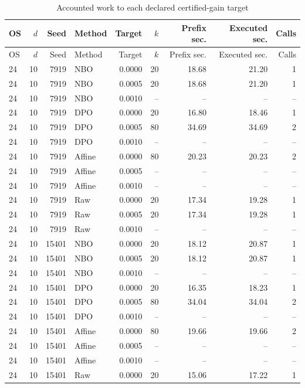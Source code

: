 \begingroup\small\setlength{\tabcolsep}{3pt}
\begin{longtable}{lrrlrrrrr}
\caption{Accounted work to each declared certified-gain target}\label{tab:r14targets}\\
\toprule
OS & $d$ & Seed & Method & Target & $k$ & Prefix sec. & Executed sec. & Calls\\\midrule
\endfirsthead
\toprule
OS & $d$ & Seed & Method & Target & $k$ & Prefix sec. & Executed sec. & Calls\\\midrule
\endhead
24 & 10 & 7919 & NBO & 0.0000 & 20 & 18.68 & 21.20 & 1\\
24 & 10 & 7919 & NBO & 0.0005 & 20 & 18.68 & 21.20 & 1\\
24 & 10 & 7919 & NBO & 0.0010 & -- & -- & -- & --\\
24 & 10 & 7919 & DPO & 0.0000 & 20 & 16.80 & 18.46 & 1\\
24 & 10 & 7919 & DPO & 0.0005 & 80 & 34.69 & 34.69 & 2\\
24 & 10 & 7919 & DPO & 0.0010 & -- & -- & -- & --\\
24 & 10 & 7919 & Affine & 0.0000 & 80 & 20.23 & 20.23 & 2\\
24 & 10 & 7919 & Affine & 0.0005 & -- & -- & -- & --\\
24 & 10 & 7919 & Affine & 0.0010 & -- & -- & -- & --\\
24 & 10 & 7919 & Raw & 0.0000 & 20 & 17.34 & 19.28 & 1\\
24 & 10 & 7919 & Raw & 0.0005 & 20 & 17.34 & 19.28 & 1\\
24 & 10 & 7919 & Raw & 0.0010 & -- & -- & -- & --\\
24 & 10 & 15401 & NBO & 0.0000 & 20 & 18.12 & 20.87 & 1\\
24 & 10 & 15401 & NBO & 0.0005 & 20 & 18.12 & 20.87 & 1\\
24 & 10 & 15401 & NBO & 0.0010 & -- & -- & -- & --\\
24 & 10 & 15401 & DPO & 0.0000 & 20 & 16.35 & 18.23 & 1\\
24 & 10 & 15401 & DPO & 0.0005 & 80 & 34.04 & 34.04 & 2\\
24 & 10 & 15401 & DPO & 0.0010 & -- & -- & -- & --\\
24 & 10 & 15401 & Affine & 0.0000 & 80 & 19.66 & 19.66 & 2\\
24 & 10 & 15401 & Affine & 0.0005 & -- & -- & -- & --\\
24 & 10 & 15401 & Affine & 0.0010 & -- & -- & -- & --\\
24 & 10 & 15401 & Raw & 0.0000 & 20 & 15.06 & 17.22 & 1\\

\end{longtable}
